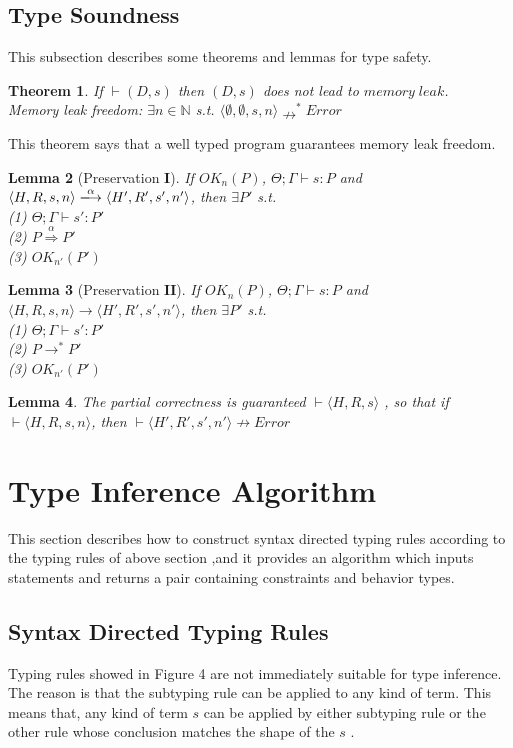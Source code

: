 \documentclass[english]{jssst_ppl} %
\newtheorem{theorem}{Theorem}[section]
\newtheorem{lemma}[theorem]{Lemma}
\theoremstyle{definition}
\begin{document}
\subsection{Type Soundness}
This subsection describes some theorems and lemmas for type safety.
\begin{theorem}\label{thm1}
If $\vdash (D, s)$ then $(D, s)$ does not lead to $memory\;leak$.\\
Memory leak freedom: $\exists n \in \mathbb{N}$ s.t.
$\langle \emptyset, \emptyset, s, n \rangle \nrightarrow^{*}Error$
\end{theorem}
\noindent
This theorem says that a well typed program guarantees memory leak freedom.
\begin{lemma}[Preservation $\mathbf{I}$]%
If $OK_{n}(P)$, $\Theta; \Gamma \vdash s : P$ and $\langle H,R,s, n \rangle
\xlongrightarrow{\alpha}\langle H',R',s', n'
\rangle$, then $\exists P'$ s.t. \\
(1) $ \Theta; \Gamma \vdash s' : P' $ \\
(2) $ P \overset{\text{$\alpha$}}{\Longrightarrow} P'$\\
(3) $ OK_{n'}(P') $
\end{lemma}
\begin{lemma}[Preservation $\mathbf{II}$]%
If $OK_{n}(P)$, $\Theta ; \Gamma \vdash s : P$ and $\langle H,R,s,n \rangle
\rightarrow \langle H',R',s', n'
\rangle$, then $\exists P'$ s.t. \\
(1) $\Theta; \Gamma \vdash s' : P'$\\
(2) $ P \rightarrow^{*} P'  $\\
(3) $OK_{n'}(P')$
\end{lemma}
\begin{lemma}%
 The partial correctness is guaranteed $\vdash \langle H,R,s \rangle$ , so that if $\vdash \langle H,R,s,n \rangle$, then $\vdash \langle H',R',s',n' \rangle \nrightarrow Error$
\end{lemma}
\section{Type Inference Algorithm}
This section describes how to construct syntax directed typing rules according to the typing rules of above section ,and it provides an algorithm which inputs statements and returns a pair containing constraints and behavior types.
\subsection{Syntax Directed Typing Rules}
Typing rules showed in Figure 4 are not immediately suitable for type inference. The reason is that the subtyping rule can be applied to any kind of term. This means that, any kind of term $s$ can be applied by either subtyping rule or the other rule whose conclusion matches the shape of the $s$ \cite{plain:book1}.
\end{document}

